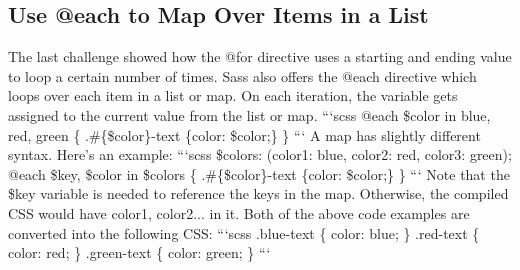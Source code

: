 \documentclass{article}%
\begin{document}
\subsection{Use @each to Map Over Items in a List}%
\label{subsec:Use@eachtoMapOverItemsinaList}%
The last challenge showed how the @for directive uses a starting and ending value to loop a certain number of times. Sass also offers the @each directive which loops over each item in a list or map.\newline%
On each iteration, the variable gets assigned to the current value from the list or map.\newline%
```scss\newline%
@each \$color in blue, red, green \{\newline%
  .\#\{\$color\}{-}text \{color: \$color;\}\newline%
\}\newline%
```\newline%
A map has slightly different syntax. Here's an example:\newline%
```scss\newline%
\$colors: (color1: blue, color2: red, color3: green);\newline%
@each \$key, \$color in \$colors \{\newline%
  .\#\{\$color\}{-}text \{color: \$color;\}\newline%
\}\newline%
```\newline%
Note that the \$key variable is needed to reference the keys in the map. Otherwise, the compiled CSS would have color1, color2... in it.\newline%
Both of the above code examples are converted into the following CSS:\newline%
```scss\newline%
.blue{-}text \{\newline%
  color: blue;\newline%
\}\newline%
.red{-}text \{\newline%
  color: red;\newline%
\}\newline%
.green{-}text \{\newline%
  color: green;\newline%
\}\newline%
```\newline%

%
\end{document}
